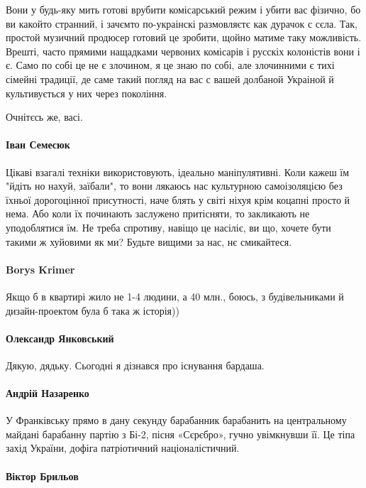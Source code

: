 Вони у будь-яку мить готові врубити комісарський режим і убити вас фізично, бо
ви какойто странний, і зачємто по-украінскі размовляєтє как дурачок с сєла.
Так, простой музичний продюсер готовий це зробити, щойно матиме таку
можливість. Врешті, часто прямими нащадками червоних комісарів і русскіх
колоністів вони і є. Само по собі це не є злочином, я це знаю по собі, але
злочинними є тихі сімейні традиції, де саме такий погляд на вас с вашей
долбаной Украіной й культивується у них через покоління.

Очнітєсь же, васі.

\paragraph{Іван Семесюк}

Цікаві взагалі техніки використовують, ідеально маніпулятивні. Коли кажеш їм
"йдіть но нахуй, заїбали", то вони лякаюсь нас культурною самоізоляцією без
їхньої дорогоцінної присутності, наче блять у світі ніхуя крім коцапні просто й
нема. Або коли їх починають заслужено притісняти, то закликають не уподоблятися
їм. Не треба спротиву, навіщо це насіліє, ви що, хочете бути такими ж хуйовими
як ми? Будьте вищими за нас, нє смикайтеся.

\paragraph{Borys Krimer}
Якщо б в квартирі жило не 1-4 людини, а 40 млн., боюсь, з будівельниками й
дизайн-проектом була б така ж історія))

\paragraph{Олександр Янковський}
Дякую, дядьку. Сьогодні я дізнався про існування бардаша.

\paragraph{Андрій Назаренко}
У Франківську прямо в дану секунду барабанник барабанить на центральному
майдані барабанну партію з Бі-2, пісня «Сєрєбро», гучно увімкнувши її. Це тіпа
захід України, дофіга патріотичний націоналістичний. 

\paragraph{Віктор Брильов}

